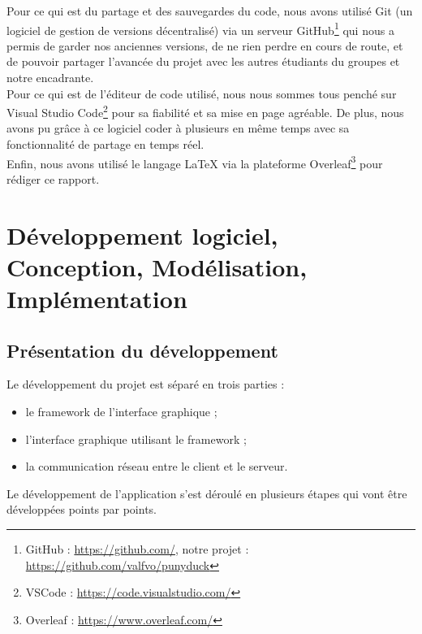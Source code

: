 \documentclass{report}
\begin{document}
Pour ce qui est du partage et des sauvegardes du code, nous avons utilisé Git (un logiciel de gestion de versions décentralisé) via un serveur GitHub\footnote{GitHub : \url{https://github.com/}, notre projet : \url{https://github.com/valfvo/punyduck}} qui nous a permis de garder nos anciennes versions, de ne rien perdre en cours de route, et de pouvoir partager l'avancée du projet avec les autres étudiants du groupes et notre encadrante. \\

Pour ce qui est de l'éditeur de code utilisé, nous nous sommes tous penché sur Visual Studio Code\footnote{VSCode : \url{https://code.visualstudio.com/}} pour sa fiabilité et sa mise en page agréable. De plus, nous avons pu grâce à ce logiciel coder à plusieurs en même temps avec sa fonctionnalité de partage en temps réel. \\

Enfin, nous avons utilisé le langage \LaTeX{} via la plateforme Overleaf\footnote{Overleaf : \url{https://www.overleaf.com/}} pour rédiger ce rapport.


\chapter{Développement logiciel, Conception, Modélisation, Implémentation}
\section{Présentation du développement}
Le développement du projet est séparé en trois parties : 
\begin{itemize}[label=$-$, leftmargin=1.5cm]
    \item le framework de l'interface graphique ;
    \item l'interface graphique utilisant le framework ;
    \item la communication réseau entre le client et le serveur.
\end{itemize}

Le développement de l'application s'est déroulé en plusieurs étapes qui vont être développées points par points.
\end{document}
